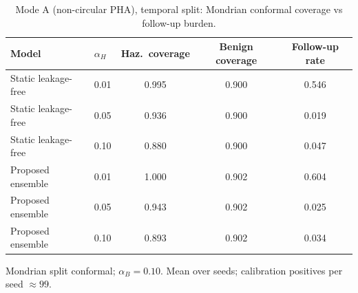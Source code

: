 \begin{table}[t]
\centering
\small
\caption{Mode A (non-circular PHA), temporal split: Mondrian conformal coverage vs follow-up burden.}
\label{tab:conf_pha_temporal}
\begin{tabular}{llccc}
\toprule
Model & $\alpha_H$ & Haz.\ coverage & Benign coverage & Follow-up rate \\
\midrule
Static leakage-free & 0.01 & 0.995 & 0.900 & 0.546 \\
Static leakage-free & 0.05 & 0.936 & 0.900 & 0.019 \\
Static leakage-free & 0.10 & 0.880 & 0.900 & 0.047 \\
\midrule
Proposed ensemble & 0.01 & 1.000 & 0.902 & 0.604 \\
Proposed ensemble & 0.05 & 0.943 & 0.902 & 0.025 \\
Proposed ensemble & 0.10 & 0.893 & 0.902 & 0.034 \\
\bottomrule
\end{tabular}
\par\vspace{2pt}\footnotesize Mondrian split conformal; $\alpha_B=0.10$. Mean over seeds; calibration positives per seed $\approx 99$.
\end{table}
